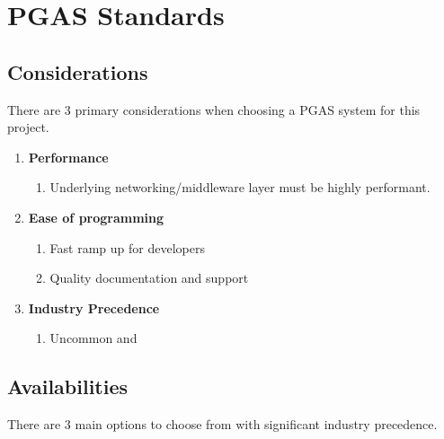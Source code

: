 \section{PGAS Standards}



\subsection{Considerations}


There are 3 primary considerations when choosing a PGAS system for this project. 

\begin{enumerate}
    \item \textbf{Performance}
    \begin{enumerate}
        \item Underlying networking/middleware layer must be highly performant.
    \end{enumerate}
    \item \textbf{Ease of programming}
    \begin{enumerate}
        \item Fast ramp up for developers
        \item Quality documentation and support
    \end{enumerate}
    \item \textbf{Industry Precedence}
    \begin{enumerate}
        \item Uncommon and 
    \end{enumerate}
\end{enumerate}


\subsection{Availabilities}

There are 3 main options to choose from with significant industry precedence. 
